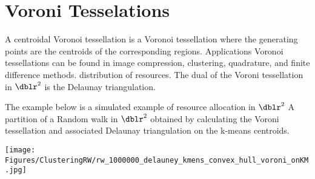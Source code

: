 \section{Voroni Tesselations}
A centroidal Voronoi tessellation is a Voronoi tessellation where the
generating points are the centroids of the corresponding regions.
Applications Voronoi tessellations can be found in image compression,
clustering, quadrature, and finite difference methods. distribution of
resources.  The dual of the Voroni tessellation in $\dblr^2$ is the Delaunay
triangulation.

The example below is a simulated example of resource allocation in $\dblr^2$
A partition of a Random walk in $\dblr^2$ obtained by calculating the Voroni
tessellation and associated Delaunay triangulation on the k-means centroids.

\texttt{[image: Figures/ClusteringRW/rw\_1000000\_delauney\_kmens\_convex\_hull\_voroni\_onKM.jpg]}
